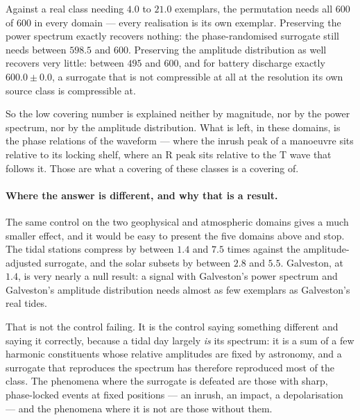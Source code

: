 \documentclass[10pt]{article}
\theoremstyle{plain}
\theoremstyle{definition}
\theoremstyle{remark}
\newcommand{\fitwidth}[1]{%
  \resizebox{\ifdim\width>\linewidth\linewidth\else\width\fi}{!}{#1}}
\begin{document}
Against a real class needing $4.0$ to $21.0$ exemplars, the permutation needs
all $600$ of $600$ in every domain --- every realisation is its own exemplar.
Preserving the power spectrum exactly recovers nothing: the phase-randomised
surrogate still needs between $598.5$ and $600$. Preserving the amplitude
distribution as well recovers very little: between $495$ and $600$, and for
battery discharge exactly $600.0 \pm 0.0$, a surrogate that is not compressible
at all at the resolution its own source class is compressible at.

So the low covering number is explained neither by magnitude, nor by the power spectrum, nor by the amplitude distribution. What is left, in these domains, is the phase relations
of the waveform --- where the inrush peak of a manoeuvre sits relative to its
locking shelf, where an R peak sits relative to the T wave that follows it.
Those are what a covering of these classes is a covering of.

\begin{table}[!htbp]\centering\small
\fitwidth{}
\caption{\small The surrogate control. $|S(\varepsilon)|$ for the real class and
for three surrogates of it, at the $\varepsilon$ of the real class, over $600$
realisations. \textsc{shuffle} destroys everything including the spectrum;
\textsc{ft} preserves the power spectrum exactly; \textsc{iaaft} preserves the
spectrum and the amplitude distribution together. The compression column is the
ratio of the last two columns and is reported as a diagnostic, not as a
performance figure.}
\label{tab:surrogates}
\end{table}

\paragraph{Where the answer is different, and why that is a result.}
The same control on the two geophysical and atmospheric domains gives a much
smaller effect, and it would be easy to present the five domains above and stop.
The tidal stations compress by between $1.4$ and $7.5$ times against the
amplitude-adjusted surrogate, and the solar subsets by between $2.8$ and $5.5$.
Galveston, at $1.4$, is very nearly a null result: a signal with Galveston's
power spectrum and Galveston's amplitude distribution needs almost as few
exemplars as Galveston's real tides.

That is not the control failing. It is the control saying something different
and saying it correctly, because a tidal day largely \emph{is} its spectrum: it
is a sum of a few harmonic constituents whose relative amplitudes are fixed by
astronomy, and a surrogate that reproduces the spectrum has therefore
reproduced most of the class. The phenomena where the surrogate is defeated are
those with sharp, phase-locked events at fixed positions --- an inrush, an
impact, a depolarisation --- and the phenomena where it is not are those without
them.
\end{document}
